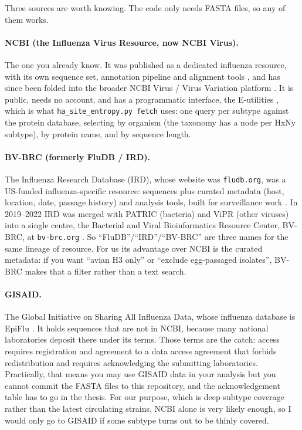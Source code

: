 \documentclass[11pt,a4paper]{article}
\newcommand{\file}[1]{\texttt{#1}}
\begin{document}
Three sources are worth knowing. The code only needs FASTA files, so any of them
works.

\paragraph{NCBI (the Influenza Virus Resource, now NCBI Virus).}
The one you already know. It was published as a dedicated influenza resource,
with its own sequence set, annotation pipeline and alignment tools
\cite{bao2008}, and has since been folded into the broader NCBI Virus / Virus
Variation platform \cite{hatcher2017}. It is public, needs no account, and has a
programmatic interface, the E-utilities \cite{eutils}, which is what
\file{ha\_site\_entropy.py fetch} uses: one query per subtype against the
protein database, selecting by organism (the taxonomy has a node per HxNy
subtype), by protein name, and by sequence length.

\paragraph{BV-BRC (formerly FluDB / IRD).}
The Influenza Research Database (IRD), whose website was \file{fludb.org}, was a
US-funded influenza-specific resource: sequences plus curated metadata (host,
location, date, passage history) and analysis tools, built for surveillance work
\cite{squires2012}. In 2019--2022 IRD was merged with PATRIC (bacteria) and ViPR
(other viruses) into a single centre, the Bacterial and Viral Bioinformatics
Resource Center, BV-BRC, at \file{bv-brc.org} \cite{olson2023}. So
``FluDB''/``IRD''/``BV-BRC'' are three names for the same lineage of resource.
For us its advantage over NCBI is the curated metadata: if you want ``avian H3
only'' or ``exclude egg-passaged isolates'', BV-BRC makes that a filter rather
than a text search.

\paragraph{GISAID.}
The Global Initiative on Sharing All Influenza Data, whose influenza database is
EpiFlu \cite{shu2017,elbe2017}. It holds sequences that are not in NCBI,
because many national laboratories deposit there under its terms. Those terms
are the catch: access requires registration and agreement to a data access
agreement that forbids redistribution and requires acknowledging the submitting
laboratories. Practically, that means you may use GISAID data in your analysis
but you cannot commit the FASTA files to this repository, and the acknowledgement
table has to go in the thesis. For our purpose, which is deep subtype coverage
rather than the latest circulating strains, NCBI alone is very likely enough, so
I would only go to GISAID if some subtype turns out to be thinly covered.
\end{document}
